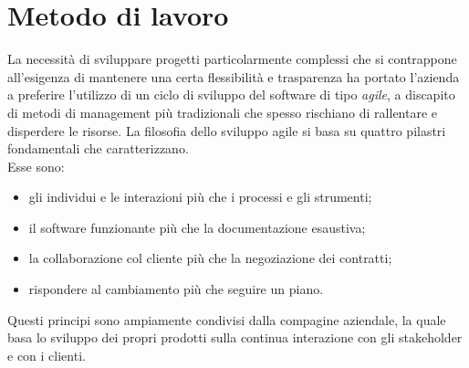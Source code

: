 \section{Metodo di lavoro}
La necessità di sviluppare progetti particolarmente complessi che si contrappone all'esigenza di mantenere una certa flessibilità e trasparenza ha portato l'azienda a preferire l'utilizzo di un ciclo di sviluppo del software di tipo \emph{agile}, a discapito di metodi di management più tradizionali che spesso rischiano di rallentare e disperdere le risorse.
La filosofia dello sviluppo agile si basa su quattro pilastri fondamentali che caratterizzano. \\ Esse sono:
\begin{itemize}
	\item gli individui e le interazioni più che i processi e gli strumenti;
	\item  il software funzionante più che la documentazione esaustiva;
	\item la collaborazione col cliente più che la negoziazione dei contratti;
	\item  rispondere al cambiamento più che seguire un piano.
\end{itemize}
Questi principi sono ampiamente condivisi dalla compagine aziendale, la quale basa lo sviluppo dei propri prodotti sulla continua interazione con gli stakeholder e con i clienti.

